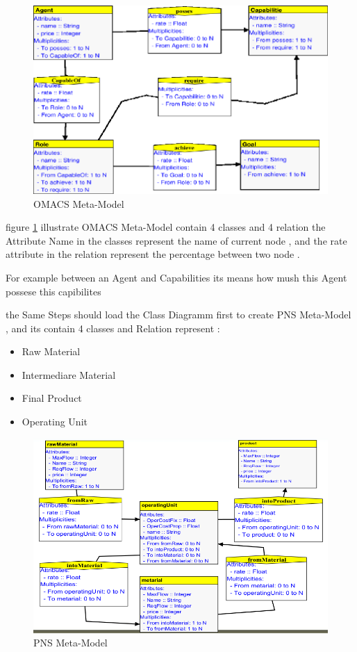 \begin{figure}[th]
		\centering
 	\includegraphics[scale=1.3]{chapiter3/img/omacs}
	\caption{\label{fig:OMACS Meta-Model}OMACS Meta-Model}
\end{figure} 
 
figure \ref{fig:OMACS Meta-Model} illustrate OMACS Meta-Model  contain 4 classes 
and 4 relation   
the Attribute Name in the classes represent the name of current node ,
and the rate attribute in the relation represent  the percentage between two node .

For example between an Agent and Capabilities its means how mush this Agent possese this capibilites

\pagebreak

the Same Steps should load the Class Diagramm first to create PNS Meta-Model , and its contain 4 classes and Relation
represent  : 
\begin{itemize}
	\item Raw Material  
	\item Intermediare Material
	\item Final Product
	\item Operating Unit
\end{itemize}

\begin{figure} 
	\centering
 	\includegraphics[scale=0.5]{chapiter3/img/a}
	\caption{\label{fig:PNS Meta-Model}PNS Meta-Model}
\end{figure} 

